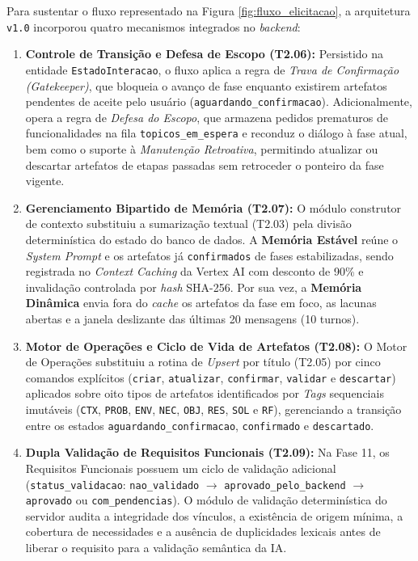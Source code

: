 Para sustentar o fluxo representado na Figura \ref{fig:fluxo_elicitacao}, a arquitetura \texttt{v1.0} incorporou quatro mecanismos integrados no \textit{backend}:

\begin{enumerate}
    \item \textbf{Controle de Transição e Defesa de Escopo (T2.06):} Persistido na entidade \texttt{EstadoInteracao}, o fluxo aplica a regra de \textit{Trava de Confirmação (Gatekeeper)}, que bloqueia o avanço de fase enquanto existirem artefatos pendentes de aceite pelo usuário (\texttt{aguardando\_confirmacao}). Adicionalmente, opera a regra de \textit{Defesa do Escopo}, que armazena pedidos prematuros de funcionalidades na fila \texttt{topicos\_em\_espera} e reconduz o diálogo à fase atual, bem como o suporte à \textit{Manutenção Retroativa}, permitindo atualizar ou descartar artefatos de etapas passadas sem retroceder o ponteiro da fase vigente.
    \item \textbf{Gerenciamento Bipartido de Memória (T2.07):} O módulo construtor de contexto substituiu a sumarização textual (T2.03) pela divisão determinística do estado do banco de dados. A \textbf{Memória Estável} reúne o \textit{System Prompt} e os artefatos já \texttt{confirmados} de fases estabilizadas, sendo registrada no \textit{Context Caching} da Vertex AI com desconto de 90\% e invalidação controlada por \textit{hash} SHA-256. Por sua vez, a \textbf{Memória Dinâmica} envia fora do \textit{cache} os artefatos da fase em foco, as lacunas abertas e a janela deslizante das últimas 20 mensagens (10 turnos).
    \item \textbf{Motor de Operações e Ciclo de Vida de Artefatos (T2.08):} O Motor de Operações substituiu a rotina de \textit{Upsert} por título (T2.05) por cinco comandos explícitos (\texttt{criar}, \texttt{atualizar}, \texttt{confirmar}, \texttt{validar} e \texttt{descartar}) aplicados sobre oito tipos de artefatos identificados por \textit{Tags} sequenciais imutáveis (\texttt{CTX}, \texttt{PROB}, \texttt{ENV}, \texttt{NEC}, \texttt{OBJ}, \texttt{RES}, \texttt{SOL} e \texttt{RF}), gerenciando a transição entre os estados \texttt{aguardando\_confirmacao}, \texttt{confirmado} e \texttt{descartado}.
    \item \textbf{Dupla Validação de Requisitos Funcionais (T2.09):} Na Fase 11, os Requisitos Funcionais possuem um ciclo de validação adicional (\texttt{status\_validacao}: \texttt{nao\_\allowbreak validado} $\rightarrow$ \texttt{aprovado\_pelo\_backend} $\rightarrow$ \texttt{aprovado} ou \texttt{com\_pendencias}). O módulo de validação determinística do servidor audita a integridade dos vínculos, a existência de origem mínima, a cobertura de necessidades e a ausência de duplicidades lexicais antes de liberar o requisito para a validação semântica da IA.
\end{enumerate}

